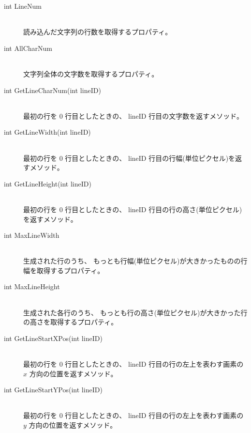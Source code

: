 \begin{description}
\item[int LineNum] ~ \\
	読み込んだ文字列の行数を取得するプロパティ。\\

\item[int AllCharNum] ~ \\
	文字列全体の文字数を取得するプロパティ。\\

\item[int GetLineCharNum(int lineID)] ~ \\
	最初の行を 0 行目としたときの、
	lineID 行目の文字数を返すメソッド。\\

\item[int GetLineWidth(int lineID)] ~ \\
	最初の行を 0 行目としたときの、
	lineID 行目の行幅(単位ピクセル)を返すメソッド。\\

\item[int GetLineHeight(int lineID)] ~ \\
	最初の行を 0 行目としたときの、
	lineID 行目の行の高さ(単位ピクセル)を返すメソッド。\\

\item[int MaxLineWidth] ~ \\
	生成された行のうち、
	もっとも行幅(単位ピクセル)が大きかったものの行幅を取得するプロパティ。\\

\item[int MaxLineHeight] ~ \\
	生成された各行のうち、
	もっとも行の高さ(単位ピクセル)が大きかった行の高さを取得するプロパティ。\\

\item[int GetLineStartXPos(int lineID)] ~ \\
	最初の行を 0 行目としたときの、
	lineID 行目の行の左上を表わす画素の \(x\) 方向の位置を返すメソッド。\\

\item[int GetLineStartYPos(int lineID)] ~ \\
	最初の行を 0 行目としたときの、
	lineID 行目の行の左上を表わす画素の \(y\) 方向の位置を返すメソッド。
\end{description}

